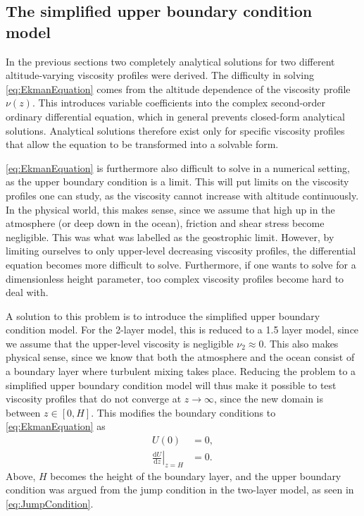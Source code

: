 \subsection{The simplified upper boundary condition model}
In the previous sections two completely analytical solutions for two different altitude-varying viscosity profiles were derived. The difficulty in solving \autoref{eq:EkmanEquation} comes from the altitude dependence of the viscosity profile $\nu(z)$. This introduces variable coefficients into the complex second-order ordinary differential equation, which in general prevents closed-form analytical solutions. Analytical solutions therefore exist only for specific viscosity profiles that allow the equation to be transformed into a solvable form.

\autoref{eq:EkmanEquation} is furthermore also difficult to solve in a numerical setting, as the upper boundary condition is a limit. This will put limits on the viscosity profiles one can study, as the viscosity cannot increase with altitude continuously. In the physical world, this makes sense, since we assume that high up in the atmosphere (or deep down in the ocean), friction and shear stress become negligible. This was what was labelled as the geostrophic limit. However, by limiting ourselves to only upper-level decreasing viscosity profiles, the differential equation becomes more difficult to solve. Furthermore, if one wants to solve for a dimensionless height parameter, too complex viscosity profiles become hard to deal with.

A solution to this problem is to introduce the simplified upper boundary condition model. For the 2-layer model, this is reduced to a 1.5 layer model, since we assume that the upper-level viscosity is negligible $\nu_2\approx0$. This also makes physical sense, since we know that both the atmosphere and the ocean consist of a boundary layer where turbulent mixing takes place. Reducing the problem to a simplified upper boundary condition model will thus make it possible to test viscosity profiles that do not converge at $z\rightarrow\infty$, since the new domain is between $z\in[0,H]$. This modifies the boundary conditions to \autoref{eq:EkmanEquation} as 
\begin{subequations}
\label{eq:NewBoundaryConditions}
\begin{align}
    U(0) &= 0,
    \label{eq:NewBoundaryCondition1}
    \\
    \left.\frac{\mathrm{d} U}{\mathrm{d} z}\right|_{z=H} &= 0.
    \label{eq:NewBoundaryCondition2}
\end{align}
\end{subequations}
Above, $H$ becomes the height of the boundary layer, and the upper boundary condition was argued from the jump condition in the two-layer model, as seen in \autoref{eq:JumpCondition}.


